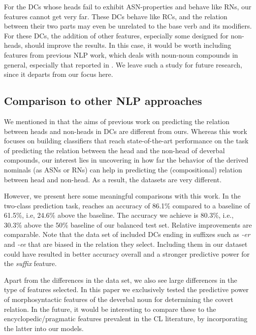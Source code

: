 \documentclass[output=paper]{langsci/langscibook}
\begin{document}
For the DCs whose heads fail to exhibit ASN-properties and behave like RNs, our features cannot get very far.  {These DCs behave like RCs, and the relation between their two parts may even be unrelated to the base verb and its modifiers.} For these DCs, the addition of other features, especially some designed for non-heads, should improve the results. In this case, it would be worth including features from previous NLP work, which deals with noun-noun compounds in general, especially that reported in . 
 {We leave such a study for future research, since it departs from our focus here.}


\subsection{Comparison to other NLP approaches}\label{sec:gia:discussion-comparison}

We mentioned in  that the aims of previous work on predicting the relation between heads and non-heads in DCs are  different from ours. Whereas this work focuses on building classifiers that reach state-of-the-art performance on the task of predicting the relation between the head and the non-head of deverbal compounds, our interest lies in uncovering in how far the behavior of the derived nominals (as ASNs or RNs) can help in predicting the (compositional) relation between head and non-head. As a result, the datasets are very different. 

However, we present here some meaningful comparisons with  this work. In the two-class prediction task, \cite{lapata:02} reaches an accuracy of 86.1\% compared to a baseline of 61.5\%, i.e, 24.6\% above the baseline. The accuracy we achieve is 80.3\%, i.e., 30.3\% above the 50\% baseline of our balanced test set. Relative improvements are comparable. Note that the data set of \cite{lapata:02} included DCs ending in suffixes such as \textit{-er} and  \textit{-ee} that are  biased in the relation they select. Including them in our dataset could have resulted in better accuracy overall and a stronger predictive power for the \textit{suffix} feature. 

Apart from the differences in the data set, we also see large differences in the type of features selected. In this paper we exclusively 
tested the predictive power of morphosyntactic features of the deverbal noun for determining the covert relation. In the future, it would be interesting to compare these to the encyclopedic/pragmatic features prevalent in the CL literature, by incorporating the latter into our models.
\end{document}
